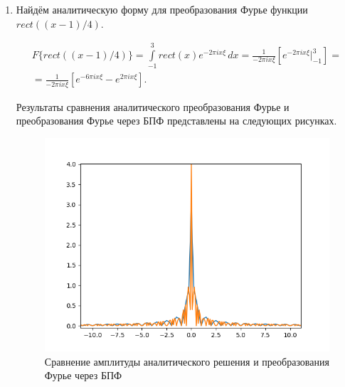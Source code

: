 {\begin{enumerate}
		\item{
			Найдём аналитическую форму для преобразования Фурье функции $rect((x-1)/4)$.
			
			
			\begin{equation}
			\begin{array}{l}
			F\{
			rect((x-1)/4)
			\} = \int\limits_{-1}^{3} rect(x) e^{-2 \pi i x \xi} \,dx
			=  \frac{1}{-2 \pi i x \xi} \left[e^{-2 \pi i x \xi}\bigg\rvert_{-1}^3\right] =\\= 
			\frac{1}{-2 \pi i x \xi} \left[e^{-6 \pi i x \xi} - e^{2 \pi i x \xi}\right]. \nonumber
			\end{array}
			\end{equation}
			
			
			Результаты сравнения аналитического преобразования Фурье и преобразования Фурье через БПФ представлены на следующих рисунках.
			\begin{figure}[H]
				\begin{center}
				\includegraphics[scale=0.7]{full_solution_ampl}
				\caption{Сравнение амплитуды аналитического решения и преобразования Фурье через БПФ}
				\label{full_solution}
					\end{center}
			\end{figure}
		
}
\end{enumerate}}

